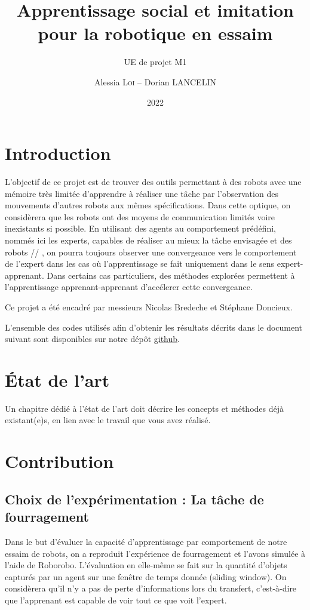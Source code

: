 \documentclass[a4paper, 12pt]{report}
\institute{Sorbonne Université}
\title{Apprentissage social et imitation pour la robotique en essaim}
\subtitle{UE de projet M1}
\author{Alessia \textsc{Loi} -- Dorian \textsc{LANCELIN}}
\date{2022}
\begin{document}
    \maketitle
    \romantableofcontents

    \chapter{Introduction}
	L'objectif de ce projet est de trouver des outils permettant à des robots avec une mémoire très limitée d'apprendre à réaliser une tâche par l'observation des mouvements d'autres robots aux mêmes spécifications.
Dans cette optique, on considèrera que les robots ont des moyens de communication limités voire inexistants si possible.
En utilisant des agents au comportement prédéfini, nommés ici les experts, capables de réaliser au mieux la tâche envisagée et des robots // , on pourra toujours observer une convergeance vers le comportement de l'expert dans les cas où l'apprentissage se fait uniquement dans le sens expert-apprenant.
    Dans certains cas particuliers, des méthodes explorées permettent à l'apprentissage apprenant-apprenant d'accélerer cette convergeance. 
    
    Ce projet a été encadré par messieurs Nicolas Bredeche et Stéphane Doncieux.  
    
    L'ensemble des codes utilisés afin d'obtenir les résultats décrits dans le document suivant sont disponibles sur notre dépôt \href{https://github.com/aerrynn/M1_Projet_ASIRE}{github}. 

    \chapter{État de l'art}
    Un chapitre dédié à l'état de l'art doit décrire les concepts et méthodes déjà existant(e)s, en lien avec le travail que vous avez réalisé.
    
    \chapter{Contribution}
   
    \section{Choix de l'expérimentation : La tâche de fourragement}
    Dans le but d'évaluer la capacité d'apprentissage par comportement de notre essaim de robots, on a reproduit l'expérience de fourragement et l'avons simulée à l'aide de Roborobo.
    L'évaluation en elle-même se fait sur la quantité d'objets capturés par un agent sur une fenêtre de temps donnée (sliding window). On considèrera qu'il n'y a pas de perte d'informations lors du transfert, c'est-à-dire que l'apprenant est capable de voir tout ce que voit l'expert.
    
\end{document}
